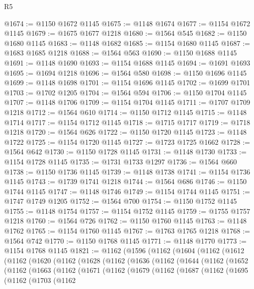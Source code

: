 \begin{lexlean}{R5}
\begin{coremodule}
@1674 := @1150 @1672 @1145
@1675 := @1148 @1674
@1677 := @1154 @1672 @1145
@1679 := @1675 @1677 @1218
@1680 := @1564 @545
@1682 := @1150 @1680 @1145
@1683 := @1148 @1682
@1685 := @1154 @1680 @1145
@1687 := @1683 @1685 @1218
@1688 := @1564 @563
@1690 := @1150 @1688 @1145
@1691 := @1148 @1690
@1693 := @1154 @1688 @1145
@1694 := @1691 @1693
@1695 := @1694 @1218
@1696 := @1564 @580
@1698 := @1150 @1696 @1145
@1699 := @1148 @1698
@1701 := @1154 @1696 @1145
@1702 := @1699 @1701
@1703 := @1702 @1205
@1704 := @1564 @594
@1706 := @1150 @1704 @1145
@1707 := @1148 @1706
@1709 := @1154 @1704 @1145
@1711 := @1707 @1709 @1218
@1712 := @1564 @610
@1714 := @1150 @1712 @1145
@1715 := @1148 @1714
@1717 := @1154 @1712 @1145
@1718 := @1715 @1717
@1719 := @1718 @1218
@1720 := @1564 @626
@1722 := @1150 @1720 @1145
@1723 := @1148 @1722
@1725 := @1154 @1720 @1145
@1727 := @1723 @1725 @1662
@1728 := @1564 @642
@1730 := @1150 @1728 @1145
@1731 := @1148 @1730
@1733 := @1154 @1728 @1145
@1735 := @1731 @1733 @1297
@1736 := @1564 @660
@1738 := @1150 @1736 @1145
@1739 := @1148 @1738
@1741 := @1154 @1736 @1145
@1743 := @1739 @1741 @1218
@1744 := @1564 @686
@1746 := @1150 @1744 @1145
@1747 := @1148 @1746
@1749 := @1154 @1744 @1145
@1751 := @1747 @1749 @1205
@1752 := @1564 @700
@1754 := @1150 @1752 @1145
@1755 := @1148 @1754
@1757 := @1154 @1752 @1145
@1759 := @1755 @1757 @1218
@1760 := @1564 @726
@1762 := @1150 @1760 @1145
@1763 := @1148 @1762
@1765 := @1154 @1760 @1145
@1767 := @1763 @1765 @1218
@1768 := @1564 @742
@1770 := @1150 @1768 @1145
@1771 := @1148 @1770
@1773 := @1154 @1768 @1145
@1821 := @1162
    (@1596
      (@1162
        (@1604
          (@1162
            (@1612
              (@1162
                (@1620
                  (@1162
                    (@1628
                      (@1162
                        (@1636
                          (@1162
                            (@1644
                              (@1162
                                (@1652
                                  (@1162
                                    (@1663
                                      (@1162
                                        (@1671
                                          (@1162
                                            (@1679
                                              (@1162
                                                (@1687
                                                  (@1162
                                                    (@1695
                                                      (@1162
                                                        (@1703
                                                          (@1162

\end{coremodule}
\end{lexlean}
